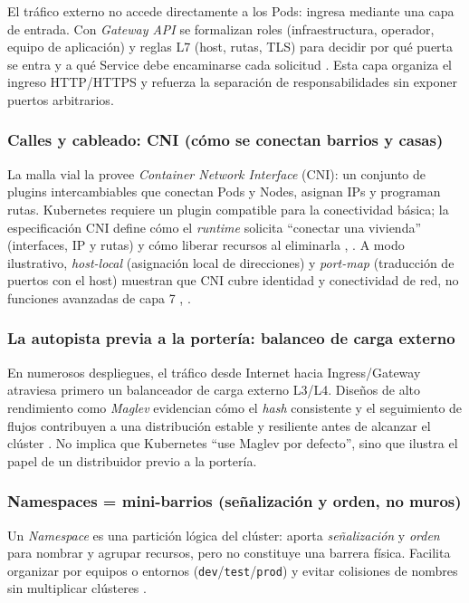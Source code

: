 \documentclass[journal]{IEEEtran}
\begin{document}
El tráfico externo no accede directamente a los Pods: ingresa mediante una capa de entrada. Con \emph{Gateway API} se formalizan roles (infraestructura, operador, equipo de aplicación) y reglas L7 (host, rutas, TLS) para decidir por qué puerta se entra y a qué Service debe encaminarse cada solicitud \cite{ref17}. Esta capa organiza el ingreso HTTP/HTTPS y refuerza la separación de responsabilidades sin exponer puertos arbitrarios.

\medskip
\subsubsection{Calles y cableado: CNI (cómo se conectan barrios y casas)}

La malla vial la provee \emph{Container Network Interface} (CNI): un conjunto de plugins intercambiables que conectan Pods y Nodes, asignan IPs y programan rutas. Kubernetes requiere un plugin compatible para la conectividad básica; la especificación CNI define cómo el \emph{runtime} solicita “conectar una vivienda” (interfaces, IP y rutas) y cómo liberar recursos al eliminarla \cite{ref4}, \cite{ref18}.
A modo ilustrativo, \emph{host-local} (asignación local de direcciones) y \emph{port-map} (traducción de puertos con el host) muestran que CNI cubre identidad y conectividad de red, no funciones avanzadas de capa 7 \cite{ref20}, \cite{ref21}.

\medskip
\subsubsection{La autopista previa a la portería: balanceo de carga externo}

En numerosos despliegues, el tráfico desde Internet hacia Ingress/Gateway atraviesa primero un balanceador de carga externo L3/L4. Diseños de alto rendimiento como \emph{Maglev} evidencian cómo el \emph{hash} consistente y el seguimiento de flujos contribuyen a una distribución estable y resiliente antes de alcanzar el clúster \cite{ref5}. No implica que Kubernetes “use Maglev por defecto”, sino que ilustra el papel de un distribuidor previo a la portería.

\subsubsection{Namespaces = mini-barrios (señalización y orden, no muros)}

Un \emph{Namespace} es una partición lógica del clúster: aporta \emph{señalización} y \emph{orden} para nombrar y agrupar recursos, pero no constituye una barrera física. Facilita organizar por equipos o entornos (\texttt{dev}/\texttt{test}/\texttt{prod}) y evitar colisiones de nombres sin multiplicar clústeres \cite{ref2}.
\end{document}
